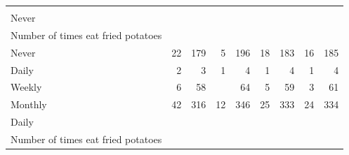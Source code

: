 \documentclass{article}
\begin{document}
\begin{table}[!h]
{\begin{tabular}{lllllllll}
			\multicolumn{1}{r}{} &
			\multicolumn{1}{r}{} \\
			\multicolumn{1}{l}{\hspace{3em}Never} &
			\multicolumn{1}{|r}{} &
			\multicolumn{1}{r}{} &
			\multicolumn{1}{r}{} &
			\multicolumn{1}{r}{} &
			\multicolumn{1}{r}{} &
			\multicolumn{1}{r}{} &
			\multicolumn{1}{r}{} &
			\multicolumn{1}{r}{} \\
			\multicolumn{1}{l}{\hspace{4em}Number of times eat fried potatoes} &
			\multicolumn{1}{|r}{} &
			\multicolumn{1}{r}{} &
			\multicolumn{1}{r}{} &
			\multicolumn{1}{r}{} &
			\multicolumn{1}{r}{} &
			\multicolumn{1}{r}{} &
			\multicolumn{1}{r}{} &
			\multicolumn{1}{r}{} \\
			\multicolumn{1}{l}{\hspace{5em}Never} &
			\multicolumn{1}{|r}{22} &
			\multicolumn{1}{r}{179} &
			\multicolumn{1}{r}{5} &
			\multicolumn{1}{r}{196} &
			\multicolumn{1}{r}{18} &
			\multicolumn{1}{r}{183} &
			\multicolumn{1}{r}{16} &
			\multicolumn{1}{r}{185} \\
			\multicolumn{1}{l}{\hspace{5em}Daily} &
			\multicolumn{1}{|r}{2} &
			\multicolumn{1}{r}{3} &
			\multicolumn{1}{r}{1} &
			\multicolumn{1}{r}{4} &
			\multicolumn{1}{r}{1} &
			\multicolumn{1}{r}{4} &
			\multicolumn{1}{r}{1} &
			\multicolumn{1}{r}{4} \\
			\multicolumn{1}{l}{\hspace{5em}Weekly} &
			\multicolumn{1}{|r}{6} &
			\multicolumn{1}{r}{58} &
			\multicolumn{1}{r}{} &
			\multicolumn{1}{r}{64} &
			\multicolumn{1}{r}{5} &
			\multicolumn{1}{r}{59} &
			\multicolumn{1}{r}{3} &
			\multicolumn{1}{r}{61} \\
			\multicolumn{1}{l}{\hspace{5em}Monthly} &
			\multicolumn{1}{|r}{42} &
			\multicolumn{1}{r}{316} &
			\multicolumn{1}{r}{12} &
			\multicolumn{1}{r}{346} &
			\multicolumn{1}{r}{25} &
			\multicolumn{1}{r}{333} &
			\multicolumn{1}{r}{24} &
			\multicolumn{1}{r}{334} \\
			\multicolumn{1}{l}{\hspace{3em}Daily} &
			\multicolumn{1}{|r}{} &
			\multicolumn{1}{r}{} &
			\multicolumn{1}{r}{} &
			\multicolumn{1}{r}{} &
			\multicolumn{1}{r}{} &
			\multicolumn{1}{r}{} &
			\multicolumn{1}{r}{} &
			\multicolumn{1}{r}{} \\
			\multicolumn{1}{l}{\hspace{4em}Number of times eat fried potatoes} &

\end{tabular}}
\end{table}
\end{document}
